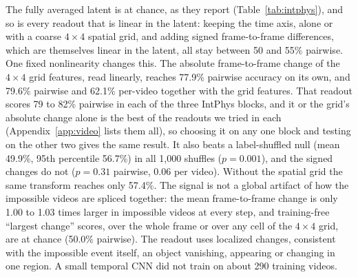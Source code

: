 The fully averaged latent is at chance, as they report (Table~\ref{tab:intphys}), and so is every readout that is linear in the latent: keeping the time axis, alone or with a coarse $4 \times 4$ spatial grid, and adding signed frame-to-frame differences, which are themselves linear in the latent, all stay between 50 and 55\% pairwise. One fixed nonlinearity changes this. The absolute frame-to-frame change of the $4 \times 4$ grid features, read linearly, reaches 77.9\% pairwise accuracy on its own, and 79.6\% pairwise and 62.1\% per-video together with the grid features. That readout scores 79 to 82\% pairwise in each of the three IntPhys blocks, and it or the grid's absolute change alone is the best of the readouts we tried in each (Appendix~\ref{app:video} lists them all), so choosing it on any one block and testing on the other two gives the same result. It also beats a label-shuffled null (mean 49.9\%, 95th percentile 56.7\%) in all 1,000 shuffles ($p = 0.001$), and the signed changes do not ($p = 0.31$ pairwise, $0.06$ per video). Without the spatial grid the same transform reaches only 57.4\%. The signal is not a global artifact of how the impossible videos are spliced together: the mean frame-to-frame change is only 1.00 to 1.03 times larger in impossible videos at every step, and training-free ``largest change'' scores, over the whole frame or over any cell of the $4 \times 4$ grid, are at chance (50.0\% pairwise). The readout uses localized changes, consistent with the impossible event itself, an object vanishing, appearing or changing in one region. A small temporal CNN did not train on about 290 training videos.

